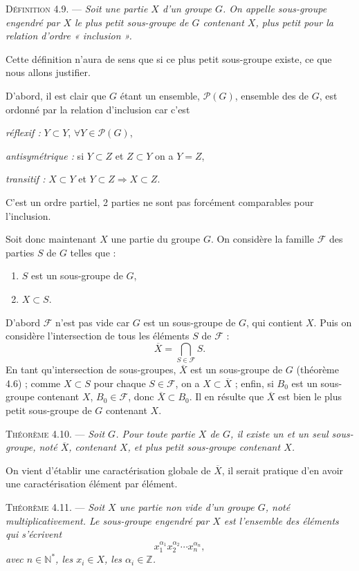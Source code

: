 \medskip\noindent\textsc{Définition 4.9.} --- \emph{Soit une partie $X$ d'un groupe $G$. On appelle sous-groupe engendré par $X$ le plus petit sous-groupe de $G$ contenant $X$, plus petit pour la relation d'ordre « inclusion ».}

Cette définition n'aura de sens que si ce plus petit sous-groupe existe, ce que nous allons justifier.

D'abord, il est clair que $G$ étant un ensemble, $\mathcal P(G)$, ensemble des  de $G$, est ordonné par la relation d'inclusion car c'est

\emph{réflexif :} $Y\subset Y$, $\forall Y\in\mathcal P(G)$,

\emph{antisymétrique :} si $Y\subset Z$ et $Z\subset Y$ on a $Y=Z$,

\emph{transitif :} $X\subset Y$ et $Y\subset Z\Rightarrow X\subset Z$.

C'est un ordre partiel, 2 parties ne sont pas forcément comparables pour l'inclusion.

Soit donc maintenant $X$ une partie du groupe $G$. On considère la famille $\mathcal F$ des parties $S$ de $G$ telles que :
\begin{enumerate}[label=\arabic*),leftmargin=2.1em]
\item $S$ est un sous-groupe de $G$,
\item $X\subset S$.
\end{enumerate}
D'abord $\mathcal F$ n'est pas vide car $G$ est un sous-groupe de $G$, qui contient $X$. Puis on considère l'intersection de tous les éléments $S$ de $\mathcal F$ :
\[
\overline X=\bigcap_{S\in\mathcal F}S.
\]
En tant qu'intersection de sous-groupes, $\overline X$ est un sous-groupe de $G$ (théorème 4.6) ; comme $X\subset S$ pour chaque $S\in\mathcal F$, on a $X\subset\overline X$ ; enfin, si $B_0$ est un sous-groupe contenant $X$, $B_0\in\mathcal F$, donc $\overline X\subset B_0$. Il en résulte que $\overline X$ est bien le plus petit sous-groupe de $G$ contenant $X$.

\medskip\noindent\textsc{Théorème 4.10.} --- \emph{Soit  $G$. Pour toute partie $X$ de $G$, il existe un et un seul sous-groupe, noté $\overline X$, contenant $X$, et plus petit sous-groupe contenant $X$.}

On vient d'établir une caractérisation globale de $\overline X$, il serait pratique d'en avoir une caractérisation élément par élément.

\medskip\noindent\textsc{Théorème 4.11.} --- \emph{Soit $X$ une partie non vide d'un groupe $G$, noté multiplicativement. Le sous-groupe engendré par $X$ est l'ensemble des éléments qui s'écrivent
\[
x_1^{\alpha_1}x_2^{\alpha_2}\cdots x_n^{\alpha_n},
\]
avec $n\in\mathbb N^*$, les $x_i\in X$, les $\alpha_i\in\mathbb Z$.}

